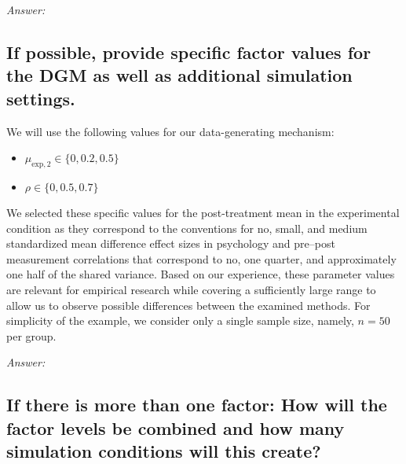 \documentclass[12pt]{article}
\begin{document}
\textit{Answer:}

\subsection{If possible, provide specific factor values for the DGM as well as additional simulation settings.}


\begin{examplebox}
We will use the following values for our data-generating mechanism:
\begin{itemize}
        \item ${\mu_{\text{exp},2}} \in \{0, 0.2, 0.5\}$
        \item $\rho \in \{0, 0.5, 0.7\}$
\end{itemize}
We selected these specific values for the post-treatment mean in the experimental condition as they correspond to the conventions for no, small, and medium standardized mean difference effect sizes in psychology \parencite{Cohen1988} and pre--post measurement correlations that correspond to no, one quarter, and approximately one half of the shared variance. Based on our experience, these parameter values are relevant for empirical research while covering a sufficiently large range to allow us to observe possible differences between the examined methods. For simplicity of the example, we consider only a single sample size, namely, $n = 50$ per group.
\end{examplebox}

\textit{Answer:}

\subsection{If there is more than one factor: How will the factor levels be combined and how many simulation conditions will this create?}

\end{document}
